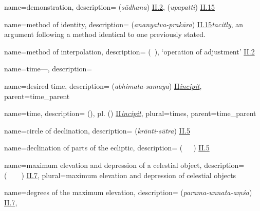 {
        name={demonstration},
        description={ (\textit{sādhana}) \hyperlink{Sii2}{II.2},  (\textit{upapatti}) \hyperlink{Sii15}{II.15}}
}

{
        name={method of identity},
        description={ (\textit{ananyatva-prakāra}) \hyperlink{Sii15}{II.15}\newline \textit{tacitly}, an argument following a method identical to one previously stated.}
}

{
        name={method of interpolation},
        description={ (\amal\idafaconsonant\ \tadil), \lit `operation of adjustment' \hyperlink{Pii2}{II.2}}
}

{
        name={time---},
        description={\phantom{x}\nopagebreak}
}

{
        name={desired time},
        description={ (\textit{abhimata-samaya}) \hyperlink{SiiInc}{II\thinspace\textit{incipit}}},
        parent={time_parent}
}

{
        name={time},
        description={ (\vaqt), pl.\thinspace {} (\avqat) \hyperlink{PiiInc}{II\thinspace\textit{incipit}}},
        plural={times},
        parent={time_parent}
}

{
        name={circle of declination},
        description={ (\textit{krānti-sūtra}) \hyperlink{Sii5}{II.5}}
}        
       

{
        name={declination of parts of the ecliptic},
        description={  (\mayl\idafaconsonant\ \ajza\idafaconsonant\ \falak\ \alburuj) \hyperlink{Pii5}{II.5}}
}

{
        name={maximum elevation and depression of a celestial object},
        description={\newline{} (\ghayat\idafaconsonant\ \irtifa\ \va\ \inkhifad\idafaconsonant\ \kawkab) \hyperlink{Pii7}{II.7}},
        plural={maximum elevation and depression of celestial objects}
}

{
        name={degrees of the maximum elevation},
        description={ (\textit{parama-unnata-aṃśa}) \hyperlink{Sii7}{II.7}},
}        


